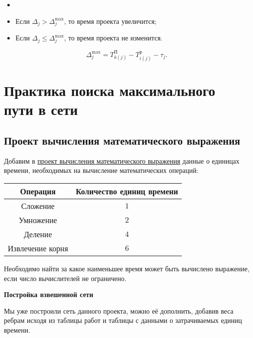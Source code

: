 \implication

\begin{itemize}[nosep]
	\item[]
	
	\item Если $\Delta_j > \Delta_j^{\max}$, то время проекта увеличится;
	
	\item Если $\Delta_j \le \Delta_j^{\max}$, то время проекта не изменится.
\end{itemize}

\implication

\[
\Delta_j^{\max} = T_{k(j)}^{\text{П}} - T_{i(j)}^{\text{р}} - \tau_j.
\]

\section{Практика поиска максимального пути в сети}

\subsection{Проект вычисления математического выражения}

Добавим в \hyperref[proj:math_expr_calc_project]{проект вычисления математического выражения} данные о единицах времени, необходимых на вычисление математических операций:

\begin{table}[H]
	\centering
	\begin{tabular}{ | c | c | } 
		\hline
		Операция & Количество единиц времени \\ \hline
		Сложение & $1$ \\ \hline
		Умножение & $2$ \\ \hline
		Деление & $4$ \\ \hline
		Извлечение корня & $6$ \\ \hline
	\end{tabular}
\end{table}

Необходимо найти за какое наименьшее время может быть вычислено выражение, если число вычислителей не ограничено.

\bigskip

\textbf{Постройка взвешенной сети}

Мы уже построили сеть данного проекта, можно её дополнить, добавив веса ребрам исходя из таблицы работ и таблицы с данными о затрачиваемых единиц времени.

